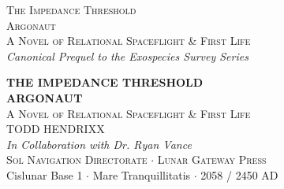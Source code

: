 \documentclass[12pt,twoside,openright]{book}
\begin{document}
\frontmatter
\pagestyle{empty}

\begin{center}
\vspace*{70pt}
{\Huge\textsc{The Impedance Threshold}}\\[1.5em]
{\Large\textsc{Argonaut}}\\[2em]
{\normalsize\scshape A Novel of Relational Spaceflight \& First Life}\\[0.5em]
{\small\itshape Canonical Prequel to the Exospecies Survey Series}
\end{center}
\clearpage

\begin{center}
\vspace*{60pt}
{\Huge\bfseries THE IMPEDANCE THRESHOLD}\\[1.0em]
{\Large\bfseries ARGONAUT}\\[1.8em]
{\large\scshape A Novel of Relational Spaceflight \& First Life}\\[3.5em]
{\Large TODD HENDRIXX}\\[1.0em]
{\normalsize\itshape In Collaboration with Dr. Ryan Vance}\\[5.0em]
{\small\scshape Sol Navigation Directorate $\cdot$ Lunar Gateway Press}\\[0.4em]
{\scriptsize\textsf{Cislunar Base 1 $\cdot$ Mare Tranquillitatis $\cdot$ 2058 / 2450 AD}}
\end{center}
\clearpage
\end{document}
